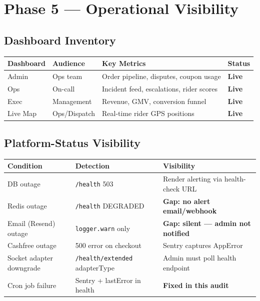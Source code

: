 \documentclass[12pt,a4paper]{article}
\newcommand{\cellok}[1]{\cellcolor{ok!15}\textbf{\color{ok}#1}}
\newcommand{\cellwarn}[1]{\cellcolor{warn!20}\textbf{\color{warn}#1}}
\begin{document}
\newpage

\section{Phase 5 — Operational Visibility}

\subsection{Dashboard Inventory}

\begin{center}
\begin{tabular}{llll}
\toprule
\textbf{Dashboard} & \textbf{Audience} & \textbf{Key Metrics} & \textbf{Status} \\
\midrule
Admin      & Ops team    & Order pipeline, disputes, coupon usage & \cellok{Live} \\
Ops        & On-call     & Incident feed, escalations, rider scores & \cellok{Live} \\
Exec       & Management  & Revenue, GMV, conversion funnel & \cellok{Live} \\
Live Map   & Ops/Dispatch & Real-time rider GPS positions & \cellok{Live} \\
\bottomrule
\end{tabular}
\end{center}

\subsection{Platform-Status Visibility}

\begin{longtable}{p{5cm}p{3cm}p{6cm}}
\toprule
\rowcolor{tableheadbg}
\textbf{\color{white}Condition} & \textbf{\color{white}Detection} & \textbf{\color{white}Visibility} \\
\midrule
DB outage & \texttt{/health} 503 & Render alerting via health-check URL \\
Redis outage & \texttt{/health} DEGRADED & \cellwarn{Gap: no alert email/webhook} \\
Email (Resend) outage & \texttt{logger.warn} only & \cellwarn{Gap: silent — admin not notified} \\
Cashfree outage & 500 error on checkout & Sentry captures AppError \\
Socket adapter downgrade & \texttt{/health/extended} adapterType & Admin must poll health endpoint \\
Cron job failure & Sentry + lastError in health & \cellok{Fixed in this audit} \\
\bottomrule
\end{longtable}
\end{document}
